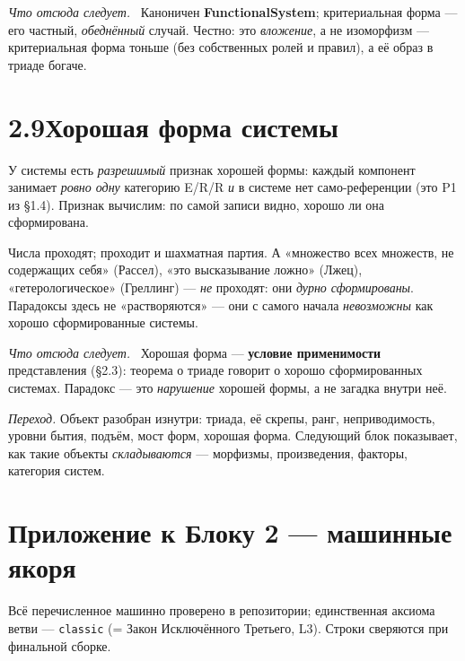 \documentclass[12pt,a4paper]{article}
\newcommand{\rezultat}{\medskip\noindent\emph{Что отсюда следует.}\ }
\begin{document}
\rezultat
Каноничен \textbf{FunctionalSystem}; критериальная форма --- его частный, \emph{обеднённый} случай.
Честно: это \emph{вложение}, а не изоморфизм --- критериальная форма тоньше (без собственных ролей и
правил), а её образ в триаде богаче.

\section*{2.9\quad Хорошая форма системы}

У системы есть \emph{разрешимый} признак хорошей формы: каждый компонент занимает \emph{ровно одну}
категорию E/R/R \emph{и} в системе нет само-референции (это P1 из §1.4). Признак вычислим: по самой
записи видно, хорошо ли она сформирована.

Числа проходят; проходит и шахматная партия. А «множество всех множеств, не содержащих себя»
(Рассел), «это высказывание ложно» (Лжец), «гетерологическое» (Греллинг) --- \emph{не} проходят: они
\emph{дурно сформированы}. Парадоксы здесь не «растворяются» --- они с самого начала \emph{невозможны}
как хорошо сформированные системы.

\rezultat
Хорошая форма --- \textbf{условие применимости} представления (§2.3): теорема о триаде говорит о
хорошо сформированных системах. Парадокс --- это \emph{нарушение} хорошей формы, а не загадка
внутри неё.

\medskip
\noindent\emph{Переход.} Объект разобран изнутри: триада, её скрепы, ранг, неприводимость, уровни
бытия, подъём, мост форм, хорошая форма. Следующий блок показывает, как такие объекты
\emph{складываются} --- морфизмы, произведения, факторы, категория систем.

\appendix
\section*{Приложение к Блоку 2 — машинные якоря}
\small\raggedright\sloppy
\noindent Всё перечисленное машинно проверено в репозитории; единственная аксиома ветви ---
\texttt{classic} (= Закон Исключённого Третьего, L3). Строки сверяются при финальной сборке.
\end{document}
